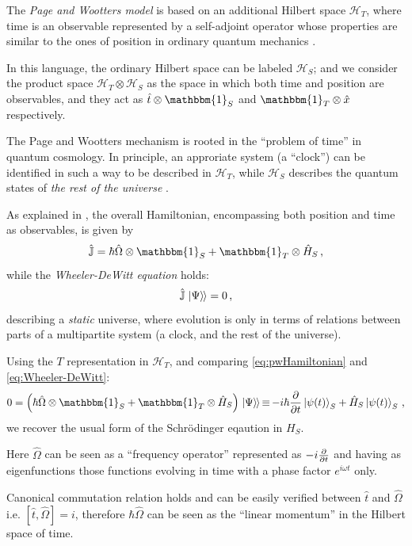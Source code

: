 \documentclass[a0,portrait]{a0poster}
\newcommand{\term}[1]{\emph{#1}}
\newcommand{\idop}{\mathbbm{1}}           %
\newcommand{\hilb}[1]{\mathcal{#1}}       %
\newcommand{\ox}{\otimes}
\DeclareMathOperator*{\repr}{\equiv}      %
\newcommand{\smallback}{\hspace{-0.115em}}
\newcommand{\dket}[1]{\left.\left| #1 \right\rangle\smallback\right\rangle}
\begin{document}
\begin{multicols}{2}
The \emph{Page and Wootters model} is based on
an additional Hilbert space $\mathcal{H}_T$,
where time is an observable
represented by a self-adjoint operator
whose properties are similar to the ones of position
in ordinary quantum mechanics
\cite{Lloyd:Time, Maccone:Pauli}.

In this language, the ordinary Hilbert space can be labeled $\mathcal{H}_S$;
and we consider the product space $\mathcal{H}_T \otimes \mathcal{H}_S$ as
the space in which both time and position are observables, and they act as
$\hat{t} \otimes \idop_S$ and $\idop_T \otimes \hat{x}$
respectively.

The Page and Wootters mechanism is rooted in the ``problem of time''
in quantum cosmology.
In principle, an approriate system (a ``clock'') can be identified in such a way
to be described in $\mathcal{H}_T$, while $\mathcal{H}_S$ describes
the quantum states of \emph{the rest of the universe} \cite{Marletto:Evolution}.

As explained in \cite{Lloyd:Time, Maccone:Pauli}, the overall Hamiltonian,
encompassing both position and time as observables, is given by
\begin{equation}\label{eq:pwHamiltonian}
  \hat{\mathbb{J}} = \hbar\hat{\Omega}\ox\idop_S + \idop_T\ox\hat{H}_S \,\text{,}
\end{equation}
while the \term{Wheeler-DeWitt equation} holds:
\begin{equation}\label{eq:Wheeler-DeWitt}
  \hat{\mathbb{J}}\dket{\Psi} = 0 \,\text{,}
\end{equation}
describing a \emph{static} universe, where evolution is only
in terms of relations between parts of a multipartite system
(a clock, and the rest of the universe).

Using the $T$ representation in $\hilb{H}_T$,
and comparing \eqref{eq:pwHamiltonian} and \eqref{eq:Wheeler-DeWitt}:
\begin{equation}\label{eq:schrod_from_pw}
  0 = \qty(\hbar\hat{\Omega}\ox\idop_S + \idop_{T}\ox\hat{H}_S)\dket{\Psi}
    \repr -i\hbar\pdv{t}\ket{\psi(t)}_{S} + \hat{H}_S\ket{\psi(t)}_{S}
    \,\text{,}
\end{equation}
we recover the usual form of the Schr\"{o}dinger eqaution in $H_S$.

Here $\hat{\Omega}$ can be seen as a ``frequency operator''
represented as $-i\pdv{t}$ and having as eigenfunctions
those functions evolving in time with a phase factor $e^{i \omega t}$ only.

Canonical commutation relation holds and can be easily verified
between $\hat{t}$ and $\hat{\Omega}$
i.e. $[\hat{t}, \hat{\Omega}] = i$,
therefore $\hbar\hat{\Omega}$ can be seen as the ``linear momentum''
in the Hilbert space of time.


\end{multicols}
\end{document}
